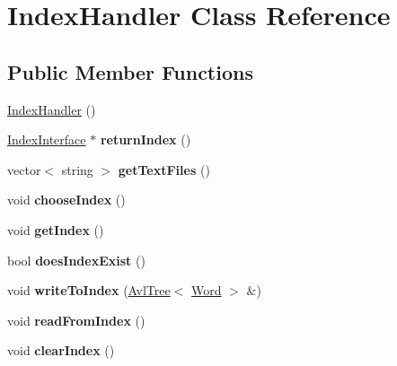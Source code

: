 \hypertarget{classIndexHandler}{}\section{Index\+Handler Class Reference}
\label{classIndexHandler}
\subsection*{Public Member Functions}
\begin{DoxyCompactItemize}
\item 
\hyperlink{classIndexHandler_a27748387661142a2eb545be6f0499996}{Index\+Handler} ()
\item 
\hyperlink{classIndexInterface}{Index\+Interface} $\ast$ {\bfseries return\+Index} ()\hypertarget{classIndexHandler_a01d6a8246b3e8221046e9c08c192b8eb}{}\label{classIndexHandler_a01d6a8246b3e8221046e9c08c192b8eb}

\item 
vector$<$ string $>$ {\bfseries get\+Text\+Files} ()\hypertarget{classIndexHandler_a9c41ddb2fa64189e3e60b91381c9985c}{}\label{classIndexHandler_a9c41ddb2fa64189e3e60b91381c9985c}

\item 
void {\bfseries choose\+Index} ()\hypertarget{classIndexHandler_afb5fd2d054cdfe1eb7cf652a09f58ff2}{}\label{classIndexHandler_afb5fd2d054cdfe1eb7cf652a09f58ff2}

\item 
void {\bfseries get\+Index} ()\hypertarget{classIndexHandler_a5511d8ae3a64fe8c22e9a1ed85434a8b}{}\label{classIndexHandler_a5511d8ae3a64fe8c22e9a1ed85434a8b}

\item 
bool {\bfseries does\+Index\+Exist} ()\hypertarget{classIndexHandler_a8c44024c502f8011bf51a181e3966447}{}\label{classIndexHandler_a8c44024c502f8011bf51a181e3966447}

\item 
void {\bfseries write\+To\+Index} (\hyperlink{classAvlTree}{Avl\+Tree}$<$ \hyperlink{classWord}{Word} $>$ \&)\hypertarget{classIndexHandler_a51223375c3966059328767ec0b5d7bfa}{}\label{classIndexHandler_a51223375c3966059328767ec0b5d7bfa}

\item 
void {\bfseries read\+From\+Index} ()\hypertarget{classIndexHandler_ab46b817dd4610b61cf5557932e37d85d}{}\label{classIndexHandler_ab46b817dd4610b61cf5557932e37d85d}

\item 
void {\bfseries clear\+Index} ()\hypertarget{classIndexHandler_a599372add7336dd68ec5ab8a8c264648}{}\label{classIndexHandler_a599372add7336dd68ec5ab8a8c264648}


\end{DoxyCompactItemize}
